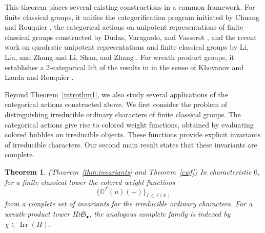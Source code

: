 \documentclass[12pt]{amsart}
\numberwithin{itemcounter}{subsection}
\theoremstyle{plain}
\newtheorem{theorem}{Theorem}[section]
\theoremstyle{definition}
\theoremstyle{remark}
\numberwithin{equation}{section}
\def\bbK{\mathbb{K}}
\def\bbO{\mathbb{O}}
\def\calI{\mathcal{I}}
\def\Irr{{\operatorname{Irr}\nolimits}}
\begin{document}
This theorem places several existing constructions in a common framework. For finite classical groups, it
unifies the categorification program initiated by Chuang and Rouquier
\cite{CR08}, the categorical actions on unipotent representations of finite
classical groups constructed by Dudas, Varagnolo, and Vasserot
\cite{DVV17,DVV19}, and the recent work on quadratic unipotent representations
and finite classical groups by Li, Liu, and Zhang \cite{LLZ} and Li, Shan, and
Zhang \cite{LSZ25}. %
For wreath product groups, it establishes a 2-categorical lift of the results in \cite{WW08} in the sense of Khovanov and Lauda \cite{KL10} and Rouquier \cite{R08}. 





Beyond Theorem~\ref{introthm1}, we also study several applications of the
categorical actions constructed above. We first consider the problem of
distinguishing irreducible ordinary characters of finite classical groups. The
categorical actions give rise to colored weight functions, obtained by
evaluating colored bubbles on irreducible objects. These functions provide
explicit invariants of irreducible characters. Our second main result states that these invariants are complete.
\begin{theorem} \label{introthm2}
{\rm (Theorem~\ref{thm:invariants} and \rm Theorem~\ref{cwf})} In characteristic $0$,
for a finite classical tower the colored weight functions
\[
    \{\bbO^\Gamma(u)(-)\}_{\Gamma\in \calI(\bbK)}
\]
form a complete set of invariants for the irreducible ordinary characters. For a wreath-product tower $H\wr\mathfrak S_\bullet$, the analogous complete family is indexed by $\chi\in\Irr(H)$.
\end{theorem}
\end{document}
